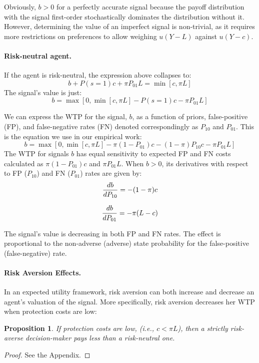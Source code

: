 \documentclass[12pt,a4paper]{article}
\newtheorem{theorem}{Proposition}
\begin{document}
Obviously, $b>0$ for a perfectly accurate signal because the payoff distribution with the signal first-order stochastically dominates the distribution without it. However, determining the value of an imperfect signal is non-trivial, as it requires more restrictions on preferences to allow weighing $u(Y-L)$ against $u(Y-c)$.


\paragraph{Risk-neutral agent.} If the agent is risk-neutral, the expression above collapses to:
\[b+P(s=1)c+\pi P_{01}L=\min[c,\pi L]
\]
The signal's value is just:
\[
b=\max[0,\min[c,\pi L]-P(s=1)c-\pi P_{01}L]
\]

We can express the WTP for the signal, $b$, as a function of priors, false-positive (FP), and false-negative rates (FN) denoted correspondingly as $P_{10}$ and $P_{01}$. This is the equation we use in our empirical work:
\begin{equation}
b=\max[0,\min[c,\pi L]-\pi (1-P_{01})c-(1-\pi)P_{10}c-\pi P_{01}L]
\end{equation}\label{eq:rnWTP}
The WTP for signals $b$ has equal sensitivity to expected FP and FN costs calculated as $\pi (1-P_{01})c$ and $\pi P_{01}L$. When $b>0$, its derivatives with respect to FP ($P_{10}$) and FN ($P_{01}$) rates are given by:
\begin{equation}\label{eq:dWTP_dFP}
{db\over dP_{10}}=-(1-\pi)c
\end{equation}

\begin{equation}\label{eq:dWTP_dFN}
{db\over dP_{01}}=-\pi(L-c)
\end{equation}
\vspace{10pt}

The signal's value is decreasing in both FP and FN rates. The effect is proportional to the non-adverse (adverse) state probability for the false-positive (false-negative) rate.

\paragraph{Risk Aversion Effects.} In an expected utility framework, risk aversion can both increase and decrease an agent's valuation of the signal. More specifically, risk aversion decreases her WTP when protection costs are low: 

\begin{theorem}
 If protection costs are low, (i.e., $c<\pi L$), then a strictly risk-averse decision-maker pays less than a risk-neutral one.
\end{theorem} 
\begin{proof}
See the Appendix.
\end{proof}
\end{document}
